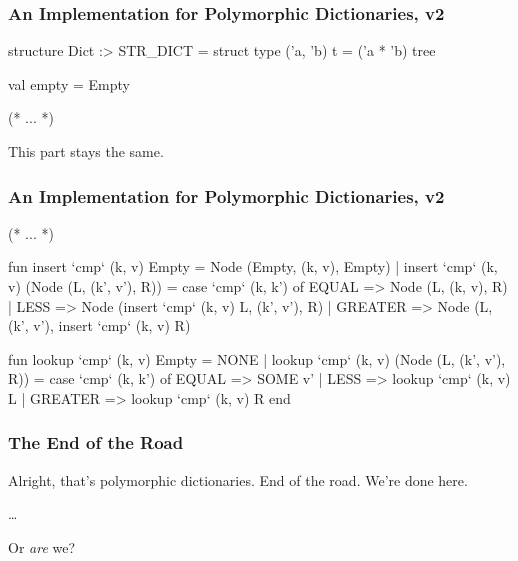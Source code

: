 \documentclass[aspectratio=169]{beamer}
\begin{document}
\begin{frame}[fragile]
  \frametitle{An Implementation for Polymorphic Dictionaries, v2}

  \begin{codeblock}
    structure Dict :> STR_DICT =
      struct
        type ('a, 'b) t = ('a * 'b) tree

        val empty = Empty

        (* ... *)
  \end{codeblock}

  \vspace{\fill}

  This part stays the same.
\end{frame}

\begin{frame}[fragile]
  \frametitle{An Implementation for Polymorphic Dictionaries, v2}
  \small
  \begin{codeblock}
    (* ... *)

      fun insert `cmp` (k, v) Empty = Node (Empty, (k, v), Empty)
        | insert `cmp` (k, v) (Node (L, (k', v'), R)) =
            case `cmp` (k, k') of
              EQUAL   => Node (L, (k, v), R)
            | LESS    => Node (insert `cmp` (k, v) L, (k', v'), R)
            | GREATER => Node (L, (k', v'), insert `cmp` (k, v) R)

      fun lookup `cmp` (k, v) Empty = NONE
        | lookup `cmp` (k, v) (Node (L, (k', v'), R)) =
            case `cmp` (k, k') of
              EQUAL   => SOME v'
            | LESS    => lookup `cmp` (k, v) L
            | GREATER => lookup `cmp` (k, v) R
    end
  \end{codeblock}
\end{frame}

\begin{frame}[fragile]
  \frametitle{The End of the Road}

  Alright, that's polymorphic dictionaries. End of the road. We're done here.

  \pause
  \vspace{\fill}

  \dots

  \pause
  \vspace{\fill}

  Or \textit{are} we?
\end{frame}
\end{document}
